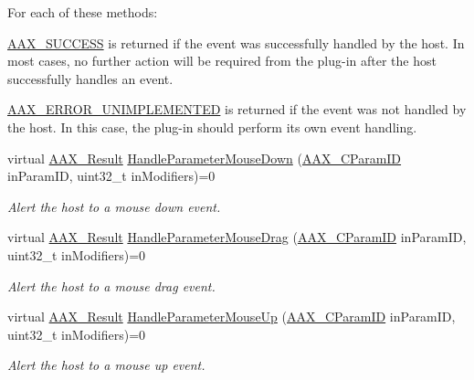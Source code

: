 \begin{Indent}
{For each of these methods\+: \begin{DoxyItemize}
\item \mbox{\hyperlink{a00494_a5f8c7439f3a706c4f8315a9609811937aeddbd1bb67e3a66e6af54a4b4a7a57b3}{A\+A\+X\+\_\+\+S\+U\+C\+C\+E\+SS}} is returned if the event was successfully handled by the host. In most cases, no further action will be required from the plug-\/in after the host successfully handles an event. \item \mbox{\hyperlink{a00494_a5f8c7439f3a706c4f8315a9609811937a3b76994b32b97fcd56b19ef8032245df}{A\+A\+X\+\_\+\+E\+R\+R\+O\+R\+\_\+\+U\+N\+I\+M\+P\+L\+E\+M\+E\+N\+T\+ED}} is returned if the event was not handled by the host. In this case, the plug-\/in should perform its own event handling. \end{DoxyItemize}
}\begin{DoxyCompactItemize}
\item 
virtual \mbox{\hyperlink{a00392_a4d8f69a697df7f70c3a8e9b8ee130d2f}{A\+A\+X\+\_\+\+Result}} \mbox{\hyperlink{a01889_a75bdb733456034a6dde5eea2043569d4}{Handle\+Parameter\+Mouse\+Down}} (\mbox{\hyperlink{a00392_a1440c756fe5cb158b78193b2fc1780d1}{A\+A\+X\+\_\+\+C\+Param\+ID}} in\+Param\+ID, uint32\+\_\+t in\+Modifiers)=0
\begin{DoxyCompactList}\small\item\em Alert the host to a mouse down event. \end{DoxyCompactList}\item 
virtual \mbox{\hyperlink{a00392_a4d8f69a697df7f70c3a8e9b8ee130d2f}{A\+A\+X\+\_\+\+Result}} \mbox{\hyperlink{a01889_a86a4b56270153bb8fa38eccd48e3c080}{Handle\+Parameter\+Mouse\+Drag}} (\mbox{\hyperlink{a00392_a1440c756fe5cb158b78193b2fc1780d1}{A\+A\+X\+\_\+\+C\+Param\+ID}} in\+Param\+ID, uint32\+\_\+t in\+Modifiers)=0
\begin{DoxyCompactList}\small\item\em Alert the host to a mouse drag event. \end{DoxyCompactList}\item 
virtual \mbox{\hyperlink{a00392_a4d8f69a697df7f70c3a8e9b8ee130d2f}{A\+A\+X\+\_\+\+Result}} \mbox{\hyperlink{a01889_a28458b791dc2fede05e64c1e5f596855}{Handle\+Parameter\+Mouse\+Up}} (\mbox{\hyperlink{a00392_a1440c756fe5cb158b78193b2fc1780d1}{A\+A\+X\+\_\+\+C\+Param\+ID}} in\+Param\+ID, uint32\+\_\+t in\+Modifiers)=0
\begin{DoxyCompactList}\small\item\em Alert the host to a mouse up event. \end{DoxyCompactList}\item 

\end{DoxyCompactItemize}
\end{Indent}
